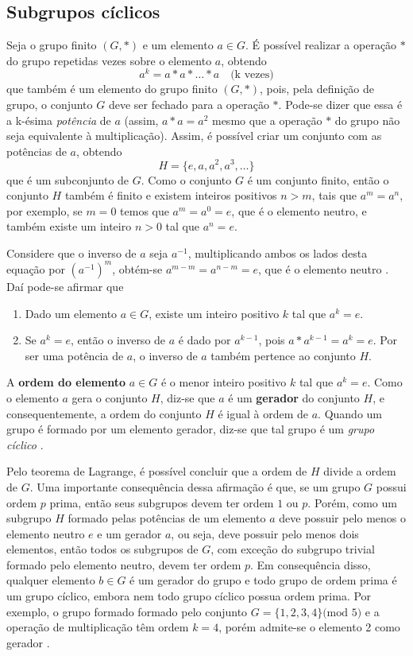 \subsection{Subgrupos cíclicos}
Seja o grupo finito $(G,*)$ e um elemento $a \in G$. É possível realizar a operação $*$ do grupo repetidas vezes sobre o elemento $a$, obtendo
$$
a^k = a * a * \ldots * a \quad\mbox{(k vezes)}
$$
que também é um elemento do grupo finito $(G,*)$, pois, pela definição de grupo, o conjunto \(G\) deve ser fechado para a operação \(*\). Pode-se dizer que essa é a k-ésima \textit{potência} de $a$ (assim, \(a * a = a^2\) mesmo que a operação $*$ do grupo não seja equivalente à multiplicação). 
Assim, é possível criar um conjunto com as potências de $a$, obtendo
$$
H = \{e, a, a^2, a^3, \ldots\}
$$
que é um subconjunto de $G$. Como o conjunto $G$ é um conjunto finito, então o conjunto $H$ também é finito e existem inteiros positivos $n > m$, tais que $a^m = a^n$, por exemplo, se \(m = 0\) temos que \(a^m = a^0 = e\), que é o elemento neutro, e também existe um inteiro \(n > 0\) tal que \(a^n = e\). 

Considere que o inverso de $a$ seja $a^{-1}$, multiplicando ambos os lados desta equação por $(a^{-1})^m$, obtém-se $a^{m - m} = a^{n-m} = e$, que é o elemento neutro \cite{Coutinho:2014}. Daí pode-se afirmar que
\begin{enumerate}
\item Dado um elemento $a \in G$, existe um inteiro positivo $k$ tal que $a^k = e$.
\item Se $a^k = e$, então o inverso de $a$ é dado por $a^{k-1}$, pois $a * a^{k-1} = a^k = e$. Por ser uma potência de $a$, o inverso de $a$ também pertence ao conjunto $H$.
\end{enumerate}

A \textbf{ordem do elemento} $a \in G$ é o menor inteiro positivo $k$ tal que $a^k = e$. Como o elemento $a$ gera o conjunto $H$, diz-se que $a$ é um \textbf{gerador} do conjunto $H$, e consequentemente, a ordem do conjunto $H$ é igual à ordem de $a$. Quando um grupo é formado por um elemento gerador, diz-se que tal grupo é um \textit{grupo cíclico} \cite{Coutinho:2014}.

Pelo teorema de Lagrange, é possível concluir que a ordem de $H$ divide a ordem de $G$. Uma importante consequência dessa afirmação é que, se um grupo $G$ possui ordem $p$ prima, então seus subgrupos devem ter ordem $1$ ou $p$. Porém, como um subgrupo $H$ formado pelas potências de um elemento $a$ deve possuir pelo menos o elemento neutro $e$ e um gerador $a$, ou seja, deve possuir pelo menos dois elementos, então todos os subgrupos de $G$, com exceção do subgrupo trivial formado pelo elemento neutro, devem ter ordem $p$. Em consequência disso, qualquer elemento $b \in G$ é um gerador do grupo e todo grupo de ordem prima é um grupo cíclico, embora nem todo grupo cíclico possua ordem prima. Por exemplo, o grupo formado formado pelo conjunto $G=\{1,2,3,4\} \mbox{(mod 5)}$ e a operação de multiplicação têm ordem $k = 4$, porém admite-se o elemento 2 como gerador \cite{Coutinho:2014}.

